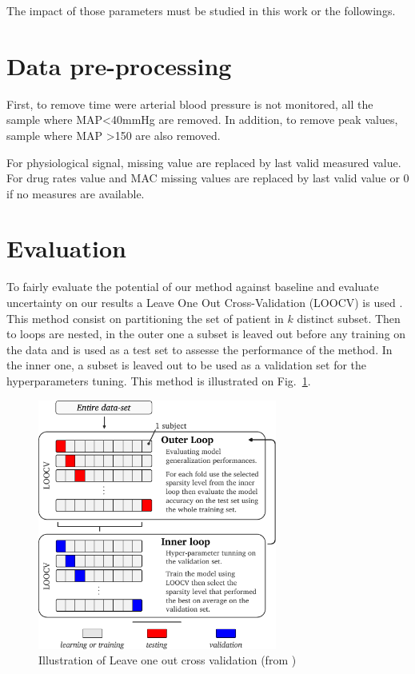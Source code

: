 \documentclass[a4paper,12pt]{article}
\begin{document}
The impact of those parameters must be studied in this work or the followings.

\section{Data pre-processing}

First, to remove time were arterial blood pressure is not monitored, all the sample where MAP<40mmHg are removed. In addition, to remove peak values, sample where MAP >150 are also removed.

For physiological signal, missing value are replaced by last valid measured value. For drug rates value and MAC missing values are replaced by last valid value or 0 if no measures are available.



\section{Evaluation}

To fairly evaluate the potential of our method against baseline and evaluate uncertainty on our results a Leave One Out Cross-Validation (LOOCV) is used \cite{meghnoudjSparseOptimalControlbased2024}. This method consist on partitioning the set of patient in $k$ distinct subset. Then to loops are nested, in the outer one a subset is leaved out before any training on the data and is used as a test set to assesse the performance of the method. In the inner one, a subset is leaved out to be used as a validation set for the hyperparameters tuning. This method is illustrated on Fig.~\ref{fig:loocv}.

\begin{figure}
    \centering
    \includegraphics[width=0.7\textwidth]{figures/chap_1_NLOO.pdf}
    \caption{Illustration of Leave one out cross validation (from \cite{meghnoudjSparseOptimalControlbased2024})}
    \label{fig:loocv}
\end{figure}
\end{document}
